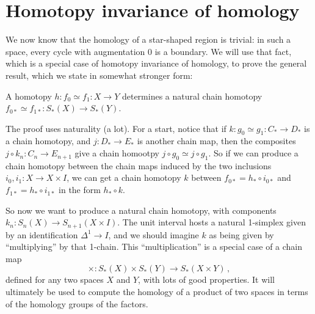 \section{Homotopy invariance of homology}
We now know that the homology of a star-shaped region is trivial: in such a space, every cycle with augmentation 0 is a boundary. We will use that fact, which is a special case of homotopy invariance of homology, to prove the general result, which we state in somewhat stronger form:
	\begin{theorem}
A homotopy $h:f_0\simeq f_1:X\to Y$ determines a natural chain homotopy
$f_{0\ast}\simeq f_{1\ast}:S_\ast(X)\to S_\ast(Y)$.
	\end{theorem}

The proof uses naturality (a lot). For a start, notice that if $k:g_0\simeq g_1:C_*\to D_*$ is a chain homotopy, and $j:D_*\to E_*$ is another chain map, then the composites $j\circ k_n:C_n\to E_{n+1}$ give a chain homootpy $j\circ g_0\simeq j\circ g_1$. So if we can produce a chain homotopy between the chain maps induced by the two inclusions $i_0,i_1:X\to X\times I$, we can get a chain homotopy $k$ between $f_{0*}=h_*\circ i_{0*}$ and 
$f_{1*}=h_*\circ i_{1*}$ in the form $h_*\circ k$. 

So now we want to produce a natural chain homotopy, with components 
$k_n:S_n(X)\to S_{n+1}(X\times I)$. The unit interval hosts a natural 1-simplex
given by an identification $\Delta^1\to I$, and we should imagine $k$ as being
given by ``multiplying'' by that 1-chain. This ``multiplication'' is a special
case of a chain map 
\[
\times:S_*(X)\times S_*(Y)\to S_*(X\times Y)\,,
\]
defined for any two spaces $X$ and $Y$, 
with lots of good properties. It will ultimately be used to compute the homology of a product of two spaces in terms of the homology groups of the factors. 

